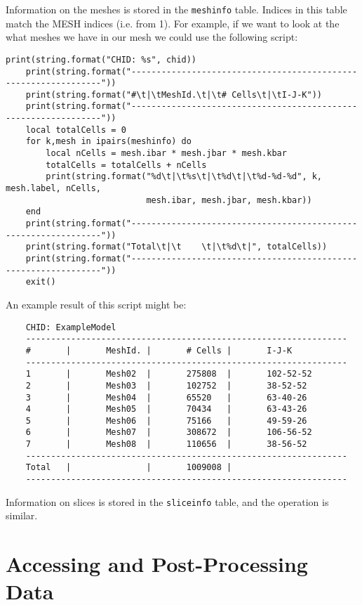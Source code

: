 \documentclass[11pt,twoside]{book}
\begin{document}
Information on the meshes is stored in the \lstinline{meshinfo} table. Indices
in this table match the MESH indices (i.e. from 1). For example, if we want to
look at the what meshes we have in our mesh we could use the following script:

\begin{lstlisting}[style=lua]
    print(string.format("CHID: %s", chid))
    print(string.format("----------------------------------------------------------------"))
    print(string.format("#\t|\tMeshId.\t|\t# Cells\t|\tI-J-K"))
    print(string.format("----------------------------------------------------------------"))
    local totalCells = 0
    for k,mesh in ipairs(meshinfo) do
        local nCells = mesh.ibar * mesh.jbar * mesh.kbar
        totalCells = totalCells + nCells
        print(string.format("%d\t|\t%s\t|\t%d\t|\t%d-%d-%d", k, mesh.label, nCells,
                            mesh.ibar, mesh.jbar, mesh.kbar))
    end
    print(string.format("----------------------------------------------------------------"))
    print(string.format("Total\t|\t    \t|\t%d\t|", totalCells))
    print(string.format("----------------------------------------------------------------"))
    exit()
\end{lstlisting}

An example result of this script might be:

\begin{lstlisting}
    CHID: ExampleModel
    ----------------------------------------------------------------
    #       |       MeshId. |       # Cells |       I-J-K
    ----------------------------------------------------------------
    1       |       Mesh02  |       275808  |       102-52-52
    2       |       Mesh03  |       102752  |       38-52-52
    3       |       Mesh04  |       65520   |       63-40-26
    4       |       Mesh05  |       70434   |       63-43-26
    5       |       Mesh06  |       75166   |       49-59-26
    6       |       Mesh07  |       308672  |       106-56-52
    7       |       Mesh08  |       110656  |       38-56-52
    ----------------------------------------------------------------
    Total   |               |       1009008 |
    ----------------------------------------------------------------
\end{lstlisting}

Information on slices is stored in the \lstinline{sliceinfo} table, and the
operation is similar.

\section{Accessing and Post-Processing Data}
\end{document}
